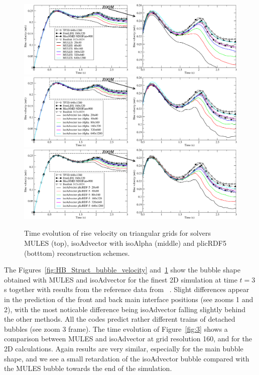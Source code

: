 \documentclass[review]{elsarticle}
\begin{document}
\begin{figure}[!h]
\begin{center}
 \vspace{-1mm}
 \includegraphics[width=\textwidth]{figures/HysingB-uns_bubble_velocity_MULES.pdf}
 \includegraphics[width=\textwidth]{figures/HysingB-uns_bubble_velocity_isoAlpha.pdf}
 \includegraphics[width=\textwidth]{figures/HysingB-uns_bubble_velocity_plicRDF5.pdf}
 \vspace{-14mm}
\end{center}
\caption{Time evolution of rise velocity on triangular grids for solvers MULES (top), isoAdvector with isoAlpha (middle) and plicRDF5 (botttom) reconstruction schemes.}
\label{fig:HB_Uns_bubble_velocity}
\end{figure}


 
The Figures~\ref{fig:HB_Struct_bubble_velocity} and~\ref{fig:HB_Uns_bubble_velocity} show the bubble shape obtained with MULES and isoAdvector for the finest 2D simulation at time $t = 3$ s together with results from the reference data from ~\cite{Hysing2009}. Slight differences appear in the prediction of the front and back main interface positions (see zooms 1 and 2), with the most noticable difference being isoAdvector falling slightly behind the other methods. All the codes predict rather different trains of detached bubbles (see zoom 3 frame). The time evolution of Figure~\ref{fig:3} shows a comparison between MULES and isoAdvector at grid resolution 160, and for the 2D calculations. Again results are very similar, especially for the main bubble shape, and we see a small retardation of the isoAdvector bubble compared with the MULES bubble towards the end of the simulation.
\end{document}
